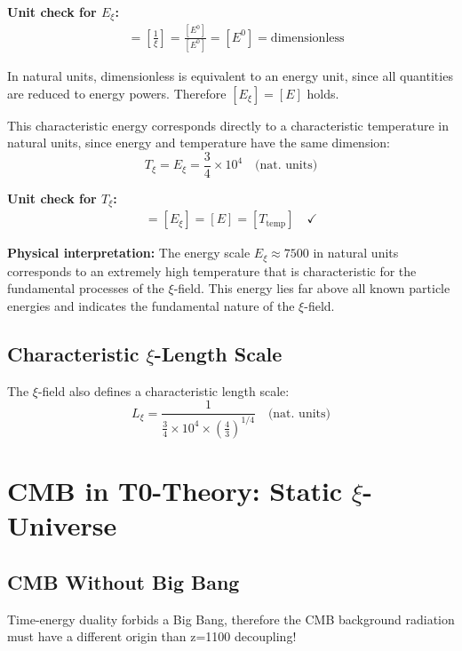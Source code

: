 \documentclass[12pt,a4paper]{article}
\begin{document}
	\textbf{Unit check for $E_\xi$:}
	\begin{align}
		[E_\xi] &= \left[\frac{1}{\xi}\right] = \frac{[E^0]}{[E^0]} = [E^0] = \text{dimensionless}
	\end{align}
	
	In natural units, dimensionless is equivalent to an energy unit, since all quantities are reduced to energy powers. Therefore $[E_\xi] = [E]$ holds.
	
	This characteristic energy corresponds directly to a characteristic temperature in natural units, since energy and temperature have the same dimension:
	\begin{equation}
		T_\xi = E_\xi = \frac{3}{4} \times 10^4 \quad \text{(nat. units)}
	\end{equation}
	
	\textbf{Unit check for $T_\xi$:}
	\begin{align}
		[T_\xi] = [E_\xi] = [E] = [T_{\text{temp}}] \quad \checkmark
	\end{align}
	
	\textbf{Physical interpretation:} The energy scale $E_\xi \approx 7500$ in natural units corresponds to an extremely high temperature that is characteristic for the fundamental processes of the $\xi$-field. This energy lies far above all known particle energies and indicates the fundamental nature of the $\xi$-field.
	
	\subsection{Characteristic $\xi$-Length Scale}
	
	The $\xi$-field also defines a characteristic length scale:
	\begin{equation}
		L_\xi = \frac{1}{\frac{3}{4} \times 10^4 \times \left(\frac{4}{3}\right)^{1/4}} \quad \text{(nat. units)}
	\end{equation}
	
	\section{CMB in T0-Theory: Static $\xi$-Universe}
	
	\subsection{CMB Without Big Bang}
	
	\begin{revolutionary}
		Time-energy duality forbids a Big Bang, therefore the CMB background radiation must have a different origin than z=1100 decoupling!
	\end{revolutionary}
	
\end{document}
